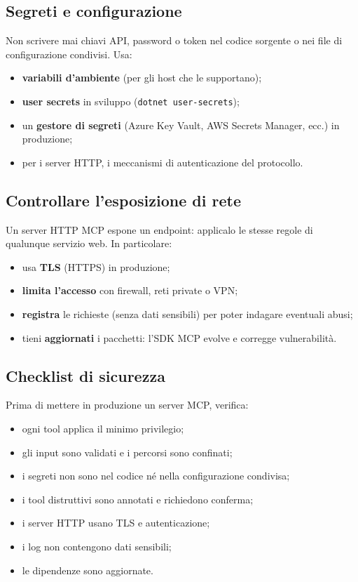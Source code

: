 \documentclass[
  italian,
  10pt,
]{book}
\providecommand{\tightlist}{%
  \setlength{\itemsep}{0pt}\setlength{\parskip}{0pt}}
\begin{document}
\subsection{Segreti e configurazione}\label{segreti-e-configurazione}

Non scrivere mai chiavi API, password o token nel codice sorgente o nei
file di configurazione condivisi. Usa:

\begin{itemize}
\tightlist
\item
  \textbf{variabili d'ambiente} (per gli host che le supportano);
\item
  \textbf{user secrets} in sviluppo (\texttt{dotnet\ user-secrets});
\item
  un \textbf{gestore di segreti} (Azure Key Vault, AWS Secrets Manager,
  ecc.) in produzione;
\item
  per i server HTTP, i meccanismi di autenticazione del protocollo.
\end{itemize}

\subsection{Controllare l'esposizione di
rete}\label{controllare-lesposizione-di-rete}

Un server HTTP MCP espone un endpoint: applicalo le stesse regole di
qualunque servizio web. In particolare:

\begin{itemize}
\tightlist
\item
  usa \textbf{TLS} (HTTPS) in produzione;
\item
  \textbf{limita l'accesso} con firewall, reti private o VPN;
\item
  \textbf{registra} le richieste (senza dati sensibili) per poter
  indagare eventuali abusi;
\item
  tieni \textbf{aggiornati} i pacchetti: l'SDK MCP evolve e corregge
  vulnerabilità.
\end{itemize}

\subsection{Checklist di sicurezza}\label{checklist-di-sicurezza}

Prima di mettere in produzione un server MCP, verifica:

\begin{itemize}
\tightlist
\item[$\square$]
  ogni tool applica il minimo privilegio;
\item[$\square$]
  gli input sono validati e i percorsi sono confinati;
\item[$\square$]
  i segreti non sono nel codice né nella configurazione condivisa;
\item[$\square$]
  i tool distruttivi sono annotati e richiedono conferma;
\item[$\square$]
  i server HTTP usano TLS e autenticazione;
\item[$\square$]
  i log non contengono dati sensibili;
\item[$\square$]
  le dipendenze sono aggiornate.
\end{itemize}
\end{document}
